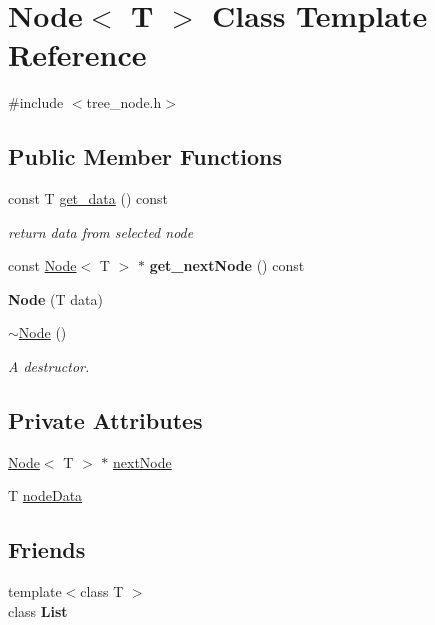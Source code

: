 \hypertarget{class_node}{}\section{Node$<$ T $>$ Class Template Reference}
\label{class_node}


{\ttfamily \#include $<$tree\+\_\+node.\+h$>$}

\subsection*{Public Member Functions}
\begin{DoxyCompactItemize}
\item 
const T \hyperlink{class_node_af8d9a6a0e0f820e7c23cd75d0d07b819}{get\+\_\+data} () const 
\begin{DoxyCompactList}\small\item\em return data from selected node \end{DoxyCompactList}\item 
\hypertarget{class_node_a9af46e4b578436facc66ccca78b9b8b0}{}const \hyperlink{class_node}{Node}$<$ T $>$ $\ast$ {\bfseries get\+\_\+next\+Node} () const \label{class_node_a9af46e4b578436facc66ccca78b9b8b0}

\item 
\hypertarget{class_node_a0692b16d246460bf94c18d49592facdd}{}{\bfseries Node} (T data)\label{class_node_a0692b16d246460bf94c18d49592facdd}

\item 
\hyperlink{class_node_ae923d0417581dd19784d55b901f0f7f0}{$\sim$\+Node} ()
\begin{DoxyCompactList}\small\item\em A destructor. \end{DoxyCompactList}\end{DoxyCompactItemize}
\subsection*{Private Attributes}
\begin{DoxyCompactItemize}
\item 
\hyperlink{class_node}{Node}$<$ T $>$ $\ast$ \hyperlink{class_node_a50e5c8a038f32c6dd61a3ba97d5c7ffc}{next\+Node}
\item 
T \hyperlink{class_node_a16f6a8aec196f06a83ad0d09c4887c25}{node\+Data}
\end{DoxyCompactItemize}
\subsection*{Friends}
\begin{DoxyCompactItemize}
\item 
\hypertarget{class_node_a8740adf5dfdafdc64940ab42ed663bd2}{}{\footnotesize template$<$class T $>$ }\\class {\bfseries List}\label{class_node_a8740adf5dfdafdc64940ab42ed663bd2}

\end{DoxyCompactItemize}


